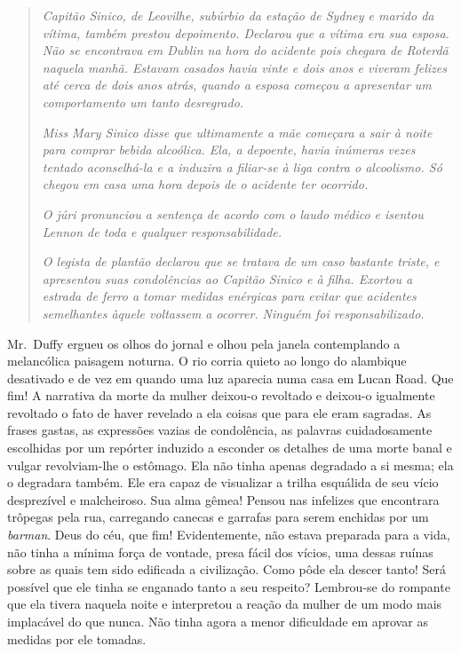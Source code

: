 \begin{quote}
\textit{Capitão Sinico, de Leovilhe, subúrbio da estação de Sydney e
marido da vítima, também prestou depoimento.  Declarou que a vítima era sua
esposa.  Não se encontrava em Dublin na hora do acidente pois
chegara de Roterdã naquela manhã.  Estavam casados havia vinte
e dois anos e viveram felizes até cerca de dois anos atrás, quando a
esposa começou a apresentar um comportamento um tanto
desregrado.}

\textit{Miss Mary Sinico disse que ultimamente a mãe começara a sair à
noite para comprar bebida alcoólica.  Ela, a depoente, havia inúmeras
vezes tentado aconselhá-la e a induzira a filiar-se à liga
contra o alcoolismo.  Só chegou em casa uma hora depois de o acidente
ter ocorrido.}

\textit{O júri pronunciou a sentença de acordo com o laudo médico e
isentou Lennon de toda e qualquer responsabilidade.}

\textit{O legista de plantão declarou que se tratava de um caso
bastante triste, e apresentou suas condolências ao Capitão Sinico e à
filha.  Exortou a estrada de ferro a tomar medidas enérgicas
para evitar que acidentes semelhantes àquele voltassem a ocorrer.
Ninguém foi responsabilizado.}
\end{quote}

\smallskip

\noindent\dotfill

\smallskip

Mr.~Duffy ergueu os olhos do jornal e olhou pela janela contemplando a
melancólica paisagem noturna.  O rio corria quieto ao longo do alambique
desativado e de vez em quando uma luz aparecia numa casa em Lucan Road.  Que
fim!  A narrativa da morte da mulher deixou-o revoltado e deixou-o igualmente
revoltado o fato de haver revelado a ela coisas que para ele eram sagradas.  As
frases gastas, as expressões vazias de condolência, as palavras cuidadosamente
escolhidas por um repórter induzido a esconder os detalhes de uma morte banal e
vulgar revolviam-lhe o estômago.  Ela não tinha apenas degradado a si mesma;
ela o degradara também.  Ele era capaz de visualizar a trilha esquálida de seu
vício desprezível e malcheiroso.  Sua alma gêmea!  Pensou nas infelizes que
encontrara trôpegas pela rua, carregando canecas e garrafas para serem enchidas
por um \textit{barman}.  Deus do céu, que fim!  Evidentemente, não estava
preparada para a vida, não tinha a mínima força de vontade, presa fácil dos
vícios, uma dessas ruínas sobre as quais tem sido edificada a civilização.
Como pôde ela descer tanto!  Será possível que ele tinha se enganado tanto a
seu respeito?  Lembrou-se do rompante que ela tivera naquela noite e
interpretou a reação da mulher de um modo mais implacável do que nunca.  Não
tinha agora a menor dificuldade em aprovar as medidas por ele tomadas.

